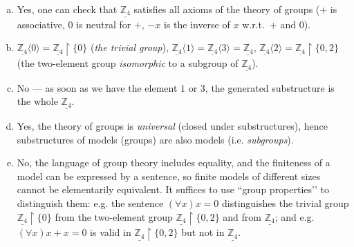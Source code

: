 \begin{problem}
\begin{solution}
        \begin{enumerate}[(a)]
            \item Yes, one can check that $\underline{\mathbb Z_4}$ satisfies all axioms of the theory of groups ($+$ is associative, $0$ is neutral for $+$, $-x$ is the inverse of $x$ w.r.t.\ $+$ and $0$).
            \item $\underline{\mathbb Z_4}\langle 0\rangle=\underline{\mathbb Z_4}\restriction\{0\}$ (\emph{the trivial group}), $\underline{\mathbb Z_4}\langle 1\rangle=\underline{\mathbb Z_4}\langle 3\rangle=\underline{\mathbb Z_4}$, $\underline{\mathbb Z_4}\langle 2\rangle=\underline{\mathbb Z_4}\restriction\{0,2\}$ (the two-element group \emph{isomorphic} to a subgroup of $\underline{\mathbb Z_4}$).
            \item No — as soon as we have the element $1$ or $3$, the generated substructure is the whole $\underline{\mathbb Z_4}$.
            \item Yes, the theory of groups is \emph{universal} (closed under substructures), hence substructures of models (groups) are also models (i.e. \emph{subgroups}).
            \item No, the language of group theory includes equality, and the finiteness of a model can be expressed by a sentence, so finite models of different sizes cannot be elementarily equivalent. It suffices to use “group properties’’ to distinguish them: e.g. the sentence $(\forall x)x=0$ distinguishes the trivial group $\underline{\mathbb Z_4}\restriction\{0\}$ from the two-element group $\underline{\mathbb Z_4}\restriction\{0,2\}$ and from $\underline{\mathbb Z_4}$; and e.g. $(\forall x)x+x=0$ is valid in $\underline{\mathbb Z_4}\restriction\{0,2\}$ but not in $\underline{\mathbb Z_4}$.
        \end{enumerate}
                    
    \end{solution}

\end{problem}


